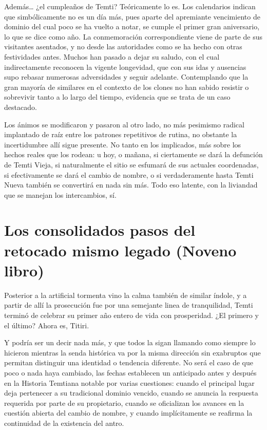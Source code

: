 \documentclass[
]{book}
\begin{document}
Además\ldots{} ¿el cumpleaños de Temti? Teóricamente lo es. Los calendarios indican que simbólicamente no es un día más, pues aparte del apremiante vencimiento de dominio del cual poco se ha vuelto a notar, se cumple el primer gran aniversario, lo que se dice como año. La conmemoración correspondiente viene de parte de sus visitantes asentados, y no desde las autoridades como se ha hecho con otras festividades antes. Muchos han pasado a dejar su saludo, con el cual indirectamente reconocen la vigente longevidad, que con sus idas y ausencias supo rebasar numerosas adversidades y seguir adelante. Contemplando que la gran mayoría de similares en el contexto de los clones no han sabido resistir o sobrevivir tanto a lo largo del tiempo, evidencia que se trata de un caso destacado.

Los ánimos se modificaron y pasaron al otro lado, no más pesimismo radical implantado de raíz entre los patrones repetitivos de rutina, no obstante la incertidumbre allí sigue presente. No tanto en los implicados, más sobre los hechos reales que los rodean: u hoy, o mañana, si ciertamente se dará la defunción de Temti Vieja, si naturalmente el sitio se esfumará de sus actuales coordenadas, si efectivamente se dará el cambio de nombre, o si verdaderamente hasta Temti Nueva también se convertirá en nada sin más. Todo eso latente, con la liviandad que se manejan los intercambios, sí.

\hypertarget{los-consolidados-pasos-del-retocado-mismo-legado-noveno-libro}{%
\chapter{Los consolidados pasos del retocado mismo legado (Noveno libro)}\label{los-consolidados-pasos-del-retocado-mismo-legado-noveno-libro}}

Posterior a la artificial tormenta vino la calma también de similar índole, y a partir de allí la prosecución fue por una semejante linea de tranquilidad, Temti terminó de celebrar su primer año entero de vida con prosperidad. ¿El primero y el último? Ahora es, Titiri.

Y podría ser un decir nada más, y que todos la sigan llamando como siempre lo hicieron mientras la senda histórica va por la misma dirección sin exabruptos que permitan distinguir una identidad o tendencia diferente. No será el caso de que poco o nada haya cambiado, las fechas establecen un anticipado antes y después en la Historia Temtiana notable por varias cuestiones: cuando el principal lugar deja pertenecer a su tradicional dominio vencido, cuando se anuncia la respuesta requerida por parte de su propietario, cuando se oficializan los avances en la cuestión abierta del cambio de nombre, y cuando implícitamente se reafirma la continuidad de la existencia del antro.
\end{document}
